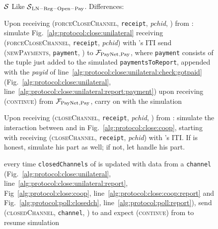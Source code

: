 \begin{figure}[!htbp]
  \begin{simulatorbox}{$\mathcal{S}$}
    Like $\mathcal{S}{}_{\mathrm{LN - Reg - Open - Pay}}$. Differences:
    \begin{algorithmic}[1]
      \State Upon receiving (\textsc{forceCloseChannel}, \texttt{receipt},
      \textit{pchid}, \alice) from \fpaynet:
      \Indent
        \State simulate Fig.~\ref{alg:protocol:close:unilateral} receiving
        (\textsc{forceCloseChannel}, \texttt{receipt}, \textit{pchid}) with
        \alice's ITI
          \State send (\textsc{newPayments}, \texttt{payment}, \alice) to
          $\mathcal{F}_{\mathrm{PayNet}}{}_{\mathrm{, Pay}}$, where \texttt{payment} consists of the
          tuple just added to the simulated \texttt{paymentsToReport}, appended
          with the \textit{payid} of
          line~\ref{alg:protocol:close:unilateral:check:gotpaid}
          (Fig.~\ref{alg:protocol:close:unilateral},
          line~\ref{alg:protocol:close:unilateral:report:payment})
          \label{alg:sim:close:unilateral:report}
          \State upon receiving (\textsc{continue}) from $\mathcal{F}_{\mathrm{PayNet}}{}_{\mathrm{,
          Pay}}$, carry on with the simulation
        \EndIf
      \EndIndent
      \Statex

      \State Upon receiving (\textsc{closeChannel}, \texttt{receipt},
      \textit{pchid}, \alice) from \fpaynet:
      \Indent
        \State simulate the interaction between \alice{} and \bob{} in
        Fig.~\ref{alg:protocol:close:coop}, starting with \alice{} receiving
        (\textsc{closeChannel}, \texttt{receipt}, \textit{pchid}) with \alice's
        ITI. If \bob{} is honest, simulate his part as well; if not, let
        \adversary{} handle his part.
        \label{alg:sim:close:coop}
      \EndIndent
      \Statex

      \State every time \texttt{closedChannels} of \alice{} is updated with data
      from a \texttt{channel} (Fig.~\ref{alg:protocol:close:unilateral},
      line~\ref{alg:protocol:close:unilateral:report},
      Fig~\ref{alg:protocol:close:coop},
      line~\ref{alg:protocol:close:coop:report} and
      Fig.~\ref{alg:protocol:poll:closedch},
      line~\ref{alg:protocol:poll:report}), send (\textsc{closedChannel},
      \texttt{channel}, \alice) to \fpaynet{} and expect (\textsc{continue})
      from \fpaynet{} to resume simulation
      \label{alg:sim:close:report}
    \end{algorithmic}
  \end{simulatorbox}
  \caption{}
  \label{alg:sim:close}
\end{figure}

